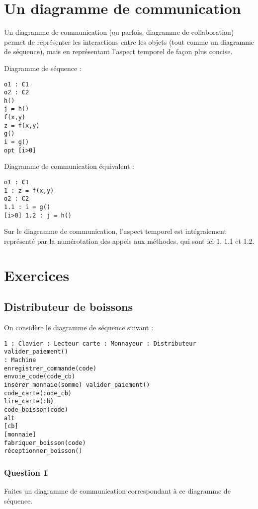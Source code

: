 \documentclass{article}
\begin{document}
\section{Un diagramme de communication}

Un diagramme de communication (ou parfois, diagramme de collaboration) permet de représenter les interactions entre les objets (tout comme un diagramme de séquence), mais en représentant l'aspect temporel de façon plus concise.

Diagramme de séquence : 
\begin{verbatim}
o1 : C1
o2 : C2
h()
j = h()
f(x,y)
z = f(x,y)
g()
i = g()
opt [i>0]
\end{verbatim}

Diagramme de communication équivalent :
\begin{verbatim}
o1 : C1
1 : z = f(x,y)
o2 : C2
1.1 : i = g()
[i>0] 1.2 : j = h()
\end{verbatim}

Sur le diagramme de communication, l'aspect temporel est intégralement représenté par la numérotation des appels aux méthodes, qui sont ici 1, 1.1 et 1.2.

\section{Exercices}

\subsection{Distributeur de boissons}

On considère le diagramme de séquence suivant :

\begin{verbatim}
1 : Clavier : Lecteur carte : Monnayeur : Distributeur
valider_paiement()
: Machine
enregistrer_commande(code)
envoie_code(code_cb)
insérer_monnaie(somme) valider_paiement()
code_carte(code_cb)
lire_carte(cb)
code_boisson(code)
alt
[cb]
[monnaie]
fabriquer_boisson(code)
réceptionner_boisson()
\end{verbatim}

\subsubsection{Question 1}

Faites un diagramme de communication correspondant à ce diagramme de séquence. 
\end{document}
